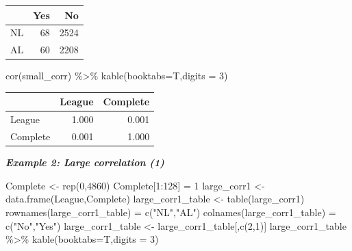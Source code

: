 \documentclass[
  11pt,
]{book}
\newenvironment{Shaded}{\begin{snugshade}}{\end{snugshade}}
\newcommand{\AttributeTok}[1]{\textcolor[rgb]{0.77,0.63,0.00}{#1}}
\newcommand{\DecValTok}[1]{\textcolor[rgb]{0.00,0.00,0.81}{#1}}
\newcommand{\FunctionTok}[1]{\textcolor[rgb]{0.00,0.00,0.00}{#1}}
\newcommand{\NormalTok}[1]{#1}
\newcommand{\OtherTok}[1]{\textcolor[rgb]{0.56,0.35,0.01}{#1}}
\newcommand{\SpecialCharTok}[1]{\textcolor[rgb]{0.00,0.00,0.00}{#1}}
\newcommand{\StringTok}[1]{\textcolor[rgb]{0.31,0.60,0.02}{#1}}
\theoremstyle{definition}
\theoremstyle{definition}
\theoremstyle{definition}
\theoremstyle{definition}
\theoremstyle{remark}
\begin{document}
\begin{tabular}{lrr}
\toprule
  & Yes & No\\
\midrule
NL & 68 & 2524\\
AL & 60 & 2208\\
\bottomrule
\end{tabular}

\begin{Shaded}
\begin{Highlighting}[]
\FunctionTok{cor}\NormalTok{(small\_corr) }\SpecialCharTok{\%\textgreater{}\%} \FunctionTok{kable}\NormalTok{(}\AttributeTok{booktabs=}\NormalTok{T,}\AttributeTok{digits =} \DecValTok{3}\NormalTok{)}
\end{Highlighting}
\end{Shaded}

\begin{tabular}{lrr}
\toprule
  & League & Complete\\
\midrule
League & 1.000 & 0.001\\
Complete & 0.001 & 1.000\\
\bottomrule
\end{tabular}

\newpage

\textbf{\emph{Example 2: Large correlation (1)}}\\

\begin{Shaded}
\begin{Highlighting}[]
\NormalTok{Complete }\OtherTok{\textless{}{-}} \FunctionTok{rep}\NormalTok{(}\DecValTok{0}\NormalTok{,}\DecValTok{4860}\NormalTok{)}
\NormalTok{Complete[}\DecValTok{1}\SpecialCharTok{:}\DecValTok{128}\NormalTok{] }\OtherTok{=} \DecValTok{1}
\NormalTok{large\_corr1 }\OtherTok{\textless{}{-}} \FunctionTok{data.frame}\NormalTok{(League,Complete)}
\NormalTok{large\_corr1\_table }\OtherTok{\textless{}{-}} \FunctionTok{table}\NormalTok{(large\_corr1)}
\FunctionTok{rownames}\NormalTok{(large\_corr1\_table) }\OtherTok{=} \FunctionTok{c}\NormalTok{(}\StringTok{"NL"}\NormalTok{,}\StringTok{"AL"}\NormalTok{)}
\FunctionTok{colnames}\NormalTok{(large\_corr1\_table) }\OtherTok{=} \FunctionTok{c}\NormalTok{(}\StringTok{"No"}\NormalTok{,}\StringTok{"Yes"}\NormalTok{)}
\NormalTok{large\_corr1\_table }\OtherTok{\textless{}{-}}\NormalTok{ large\_corr1\_table[,}\FunctionTok{c}\NormalTok{(}\DecValTok{2}\NormalTok{,}\DecValTok{1}\NormalTok{)]}
\NormalTok{large\_corr1\_table }\SpecialCharTok{\%\textgreater{}\%} \FunctionTok{kable}\NormalTok{(}\AttributeTok{booktabs=}\NormalTok{T,}\AttributeTok{digits =} \DecValTok{3}\NormalTok{)}
\end{Highlighting}
\end{Shaded}
\end{document}
